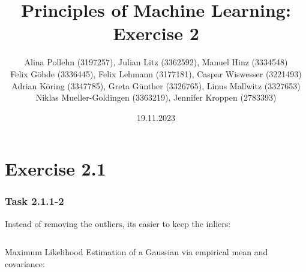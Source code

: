 \documentclass[10pt,aspectratio=169,handout]{beamer}
\begin{document}
\title{Principles of Machine Learning: Exercise 2}
\date{19.11.2023}
\author{Alina Pollehn (3197257), Julian Litz (3362592), Manuel Hinz (3334548)\\
    Felix Göhde (3336445), Felix Lehmann (3177181), Caspar Wiswesser (3221493)\\
    Adrian Köring (3347785), Greta Günther (3326765), Linus Mallwitz (3327653)\\
    Niklas Mueller-Goldingen (3363219), Jennifer Kroppen (2783393)}

\begin{frame}
    \maketitle
\end{frame}

\section{Exercise 2.1}
\begin{frame}
    \frametitle{Task 2.1.1-2}
    Instead of removing the outliers, its easier to keep the inliers:
    \inputminted[bgcolor=LightGray,fontsize=\small]{python}{code/filter-outliers.py}

    Maximum Likelihood Estimation of a Gaussian via empirical mean and covariance:
    \inputminted[bgcolor=LightGray,fontsize=\small]{python}{code/gaussian-mle.py}
\end{frame}
\end{document}
